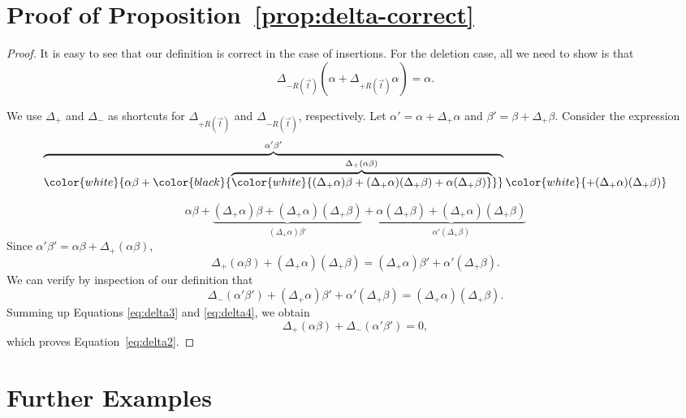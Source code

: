 

\appendix


\section{Proof of Proposition~\ref{prop:delta-correct}}


\begin{proof}
It is easy to see that our definition is correct in the case of insertions.
For the deletion case, all we need to show is that
\begin{equation}
\Delta_{-R(\vec{t})}(\alpha + \Delta_{+R(\vec{t})} \alpha) = \alpha.
\label{eq:delta2}
\end{equation}


\def\dtp{\Delta_{+}}
\def\dtm{\Delta_{-}}


We use $\dtp$ and $\dtm$ as shortcuts for $\Delta_{+R(\vec{t})}$
and $\Delta_{-R(\vec{t})}$, respectively.
Let $\alpha' = \alpha+\dtp\alpha$ and $\beta' = \beta+\dtp\beta$.
Consider the expression
\[
\overbrace{\color{white}{\alpha\beta +
\color{black}{\overbrace{\color{white}{
(\dtp \alpha)\beta + (\dtp \alpha)(\dtp \beta)
+ \alpha(\dtp \beta)}}^{\dtp (\alpha\beta)}}}}^{\alpha' \beta'}
\color{white}{+ (\dtp \alpha)(\dtp \beta)}
\]

\vspace{-14mm}

\[
\alpha\beta +
\underbrace{(\dtp \alpha)\beta + (\dtp \alpha)(\dtp \beta)}_{
(\dtp \alpha)\beta'}
+ \underbrace{
\alpha(\dtp \beta) + (\dtp \alpha)(\dtp \beta)}_{\alpha'(\dtp \beta)}
\]
Since $\alpha'\beta' = \alpha\beta + \dtp(\alpha\beta)$,
\begin{equation}
\dtp(\alpha\beta) + (\dtp\alpha)(\dtp\beta) =
(\dtp \alpha)\beta' + \alpha'(\dtp \beta).
\label{eq:delta3}
\end{equation}
We can verify by inspection of our definition that
\begin{equation}
\dtm(\alpha'\beta') + (\dtp \alpha)\beta' + \alpha'(\dtp \beta) =
(\dtp\alpha)(\dtp\beta).
\label{eq:delta4}
\end{equation}
Summing up Equations \ref{eq:delta3} and \ref{eq:delta4}, we obtain
\[
\dtp(\alpha\beta) + \dtm(\alpha'\beta') = 0,
\]
which proves Equation~\ref{eq:delta2}.
\end{proof}


\section{Further Examples}


